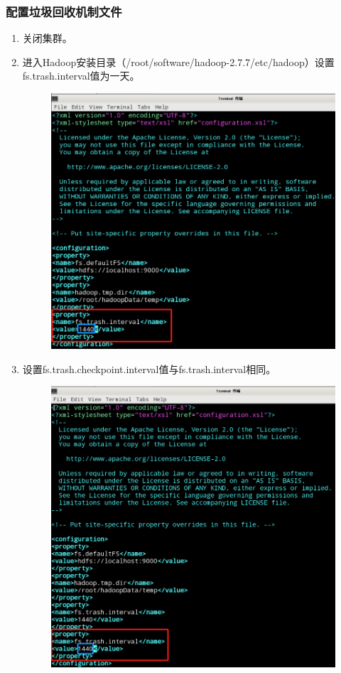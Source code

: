 \documentclass {article}
\begin{document}
			\subsubsection{配置垃圾回收机制文件}
				\begin{enumerate}
					\item 关闭集群。
					\item 进入Hadoop安装目录（/root/software/hadoop-2.7.7/etc/hadoop）设置fs.trash.interval值为一天。
					\begin{figure}[H]
						\centering
						\includegraphics[width=4.5in]{figures/fig12.png}
					\end{figure}
				
					\item 设置fs.trash.checkpoint.interval值与fs.trash.interval相同。
					\begin{figure}[H]
						\centering
						\includegraphics[width=4.5in]{figures/fig13.png}
					\end{figure}
				

\end{enumerate}
\end{document}
